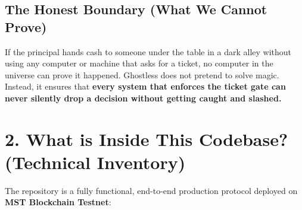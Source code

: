 \documentclass[11pt,a4paper]{article}
\begin{document}
\subsection{The Honest Boundary (What We Cannot Prove)}
If the principal hands cash to someone under the table in a dark alley without using any computer or machine that asks for a ticket, no computer in the universe can prove it happened. Ghostless does not pretend to solve magic. Instead, it ensures that \textbf{every system that enforces the ticket gate can never silently drop a decision without getting caught and slashed.}

\section{2. What is Inside This Codebase? (Technical Inventory)}

The repository is a fully functional, end-to-end production protocol deployed on \textbf{MST Blockchain Testnet}:
\end{document}
